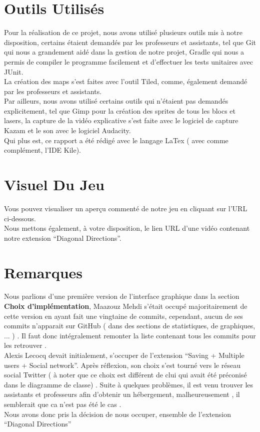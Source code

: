 \documentclass[a4paper,10pt]{article}
\begin{document}
\section{Outils Utilisés}
Pour la réalisation de ce projet, nous avons utilisé plusieurs outils mis à notre disposition, certains étaient demandés par les professeurs et assistants,
tel que Git qui nous a grandement aidé dans la gestion de notre projet, Gradle qui nous a permis de compiler le programme facilement et d'effectuer les tests unitaires
avec JUnit.\\
La création des maps s'est faites avec l'outil Tiled, comme, également demandé par les professeurs et assistants. \\

Par ailleurs, nous avons utilisé certains outils qui n'étaient pas demandés explicitement, tel que Gimp pour la création des sprites de tous les blocs et lasers,
la capture de la vidéo explicative s'est faite avec le logiciel de capture Kazam et le son avec le logiciel Audacity.\\
Qui plus est, ce rapport a été rédigé avec le langage LaTex ( avec comme complément, l'IDE Kile).
\section{Visuel Du Jeu}
Vous pouvez visualiser un aperçu commenté de notre jeu en cliquant sur l'URL ci-dessous.
\\

Nous mettons également, à votre disposition, le lien URL d'une vidéo contenant notre extension ``Diagonal Directions''.

\section{Remarques}
Nous parlions d'une première version de l'interface graphique dans la section \textbf{Choix d'implémentation}, Maazouz Mehdi s'était occupé majoritairement
de cette version en ayant fait une vingtaine de commits, cependant, aucun de ses commits n'apparait sur GitHub ( dans des sections de statistiques, 
de graphiques, ... ) . Il faut donc intégralement remonter la liste contenant tous les commits pour les retrouver .\\


Alexis Lecocq devait initialement, s'occuper de l'extension ``Saving + Multiple users + Social network''. Après réflexion, son choix
s'est tourné vers le réseau social Twitter ( à noter que ce choix est différent de clui qui avait été préconisé dans le diagramme de classe)
. Suite à quelques problèmes, il est venu trouver les assistants et professeurs afin d'obtenir un hébergement,
malheureusement , il semblerait que ca n'est pas été le cas .\\
Nous avons donc pris la décision de nous occuper, ensemble de l'extension ``Diagonal Directions''
\end{document}
